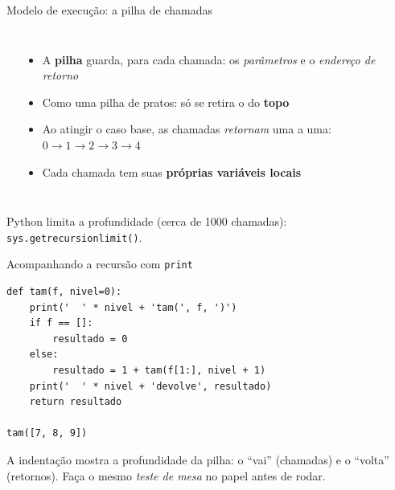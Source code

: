 \documentclass[aspectratio=169,10pt,t]{beamer}
\begin{document}
\begin{frame}{Modelo de execução: a pilha de chamadas}
  \begin{columns}[c]
    \begin{center}
    \end{center}
    \begin{itemize}\small
      \item A \textbf{pilha} guarda, para cada chamada: os \emph{parâmetros} e o \emph{endereço de retorno}
      \item Como uma pilha de pratos: só se retira o do \textbf{topo}
      \item Ao atingir o caso base, as chamadas \emph{retornam} uma a uma: \(0\to1\to2\to3\to4\)
      \item Cada chamada tem suas \textbf{próprias variáveis locais}
    \end{itemize}
  \end{columns}
  \vspace{1ex}
  {\footnotesize Python limita a profundidade (cerca de 1000 chamadas): \texttt{sys.getrecursionlimit()}.}
\end{frame}

\begin{frame}[fragile]{Acompanhando a recursão com \texttt{print}}
\begin{lstlisting}
def tam(f, nivel=0):
    print('  ' * nivel + 'tam(', f, ')')
    if f == []:
        resultado = 0
    else:
        resultado = 1 + tam(f[1:], nivel + 1)
    print('  ' * nivel + 'devolve', resultado)
    return resultado

tam([7, 8, 9])
\end{lstlisting}
  \small A indentação mostra a profundidade da pilha: o ``vai'' (chamadas) e o ``volta'' (retornos). Faça o mesmo \emph{teste de mesa} no papel antes de rodar.
\end{frame}
\end{document}
